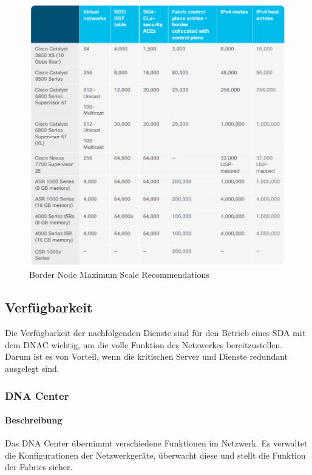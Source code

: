 \begin{figure}[H]
	\centering
	\includegraphics[width=1\linewidth]{img/Analyse/MaxScale-BorderNode}
	\caption{Border Node Maximum Scale Recommendations \cite{sda-designguide} }
	\label{fig:Border Node Maximum Scale RecommendationsA}
\end{figure}



\subsection{Verfügbarkeit}
Die Verfügbarkeit der nachfolgenden Dienste sind für den Betrieb eines SDA mit dem DNAC wichtig, um die volle Funktion des Netzwerkes bereitzustellen. Darum ist es von Vorteil, wenn die kritischen Server und Dienste redundant ausgelegt sind.

\subsubsection{DNA Center}

\paragraph{Beschreibung}

Das DNA Center übernimmt verschiedene Funktionen im Netzwerk. Es verwaltet die Konfigurationen der Netzwerkgeräte, überwacht diese und stellt die Funktion der Fabrics sicher. 

